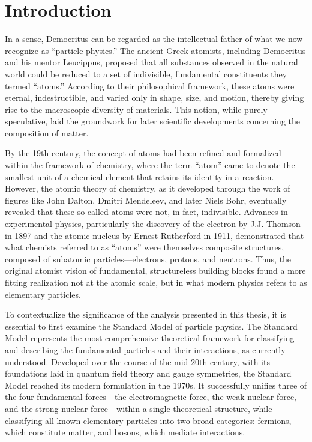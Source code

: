 \chapter{Introduction} \label{chap:chap-1}




In a sense, Democritus can be regarded as the intellectual father of what we now recognize as ``particle physics.'' The ancient Greek atomists, including Democritus and his mentor Leucippus, proposed that all substances observed in the natural world could be reduced to a set of indivisible, fundamental constituents they termed ``atoms.'' According to their philosophical framework, these atoms were eternal, indestructible, and varied only in shape, size, and motion, thereby giving rise to the macroscopic diversity of materials. This notion, while purely speculative, laid the groundwork for later scientific developments concerning the composition of matter.

By the 19th century, the concept of atoms had been refined and formalized within the framework of chemistry, where the term ``atom'' came to denote the smallest unit of a chemical element that retains its identity in a reaction. However, the atomic theory of chemistry, as it developed through the work of figures like John Dalton, Dmitri Mendeleev, and later Niels Bohr, eventually revealed that these so-called atoms were not, in fact, indivisible. Advances in experimental physics, particularly the discovery of the electron by J.J. Thomson in 1897 and the atomic nucleus by Ernest Rutherford in 1911, demonstrated that what chemists referred to as ``atoms'' were themselves composite structures, composed of subatomic particles—electrons, protons, and neutrons. Thus, the original atomist vision of fundamental, structureless building blocks found a more fitting realization not at the atomic scale, but in what modern physics refers to as elementary particles.

To contextualize the significance of the analysis presented in this thesis, it is essential to first examine the Standard Model of particle physics. The Standard Model represents the most comprehensive theoretical framework for classifying and describing the fundamental particles and their interactions, as currently understood. Developed over the course of the mid-20th century, with its foundations laid in quantum field theory and gauge symmetries, the Standard Model reached its modern formulation in the 1970s. It successfully unifies three of the four fundamental forces—the electromagnetic force, the weak nuclear force, and the strong nuclear force—within a single theoretical structure, while classifying all known elementary particles into two broad categories: fermions, which constitute matter, and bosons, which mediate interactions.

